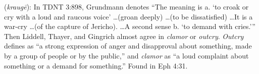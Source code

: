 \item[Clamor,]

(\textit{kraugē}):
In TDNT 3:898, Grundmann denotes ``The meaning is a. `to croak or cry with a loud and raucous voice' \ldots (groan deeply) \ldots (to be dissatisfied) \ldots It is a war-cry \ldots (of the capture of Jericho). \ldots A second sense b. `to demand with cries.''' Then Liddell, Thayer, and Gingrich almost agree in \emph{clamor} or \emph{outcry}. \emph{Outcry} defines as ``a strong expression of anger and disapproval about something, made by a group of people or by the public,'' and \emph{clamor} as ``a loud complaint about something or a demand for something.''
Found in Eph 4:31.
